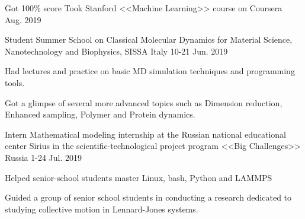 

\begin{cventries}

  \cventry
    {Got 100\% score} %
    {Took Stanford <<Machine Learning>> course on Coursera} %
    {~} %
    {Aug. 2019} %
    {
      \begin{cvitems} %
      \end{cvitems}
    }

  \cventry
    {Student} %
    {Summer School on Classical Molecular Dynamics for Material Science, Nanotechnology and Biophysics, SISSA} %
    {Italy} %
    {10-21 Jun. 2019} %
    {
      \begin{cvitems} %
        \item {Had lectures and practice on basic MD simulation techniques and programming tools.}
        \item {Got a glimpse of several more advanced topics such as Dimension reduction, Enhanced sampling, Polymer and Protein dynamics.}
      \end{cvitems}
    }

  \cventry
    {Intern} %
    {Mathematical modeling internship at the Russian national educational center Sirius in the scientific-technological project program <<Big Challenges>>} %
    {Russia} %
    {1-24 Jul. 2019} %
    {
      \begin{cvitems} %
        \item {Helped senior-school students master Linux, bash, Python and LAMMPS}
        \item {Guided a group of senior school students in conducting a research dedicated to studying collective motion in Lennard-Jones systems.}
      \end{cvitems}
    }

\end{cventries}
